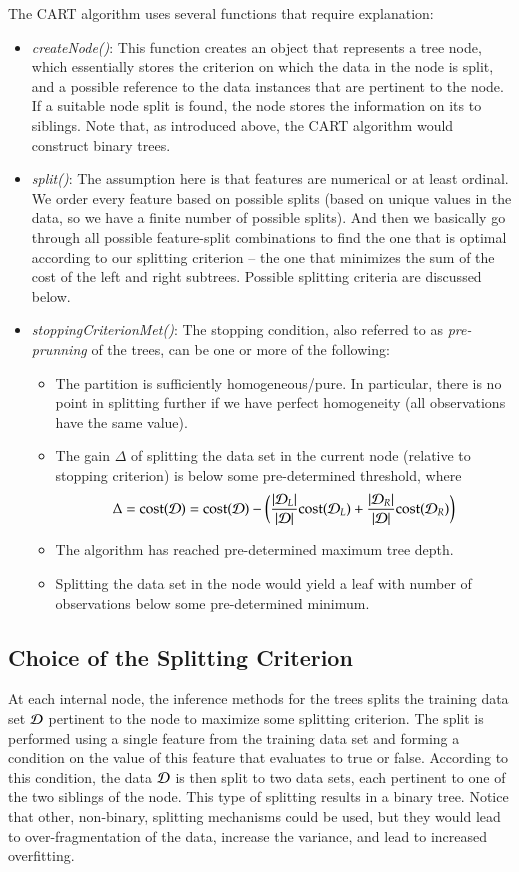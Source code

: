 \begin{refsection}
The CART algorithm uses several functions that require explanation:
\begin{itemize}
\item {\em createNode()}: This function creates an object that represents a tree node, which essentially stores the criterion on which the data in the node is split, and a possible reference to the data instances that are pertinent to the node. If a suitable node split is found, the node stores the information on its to siblings. Note that, as introduced above, the CART algorithm would construct binary trees.
\item {\em split()}: The assumption here is that features are numerical or at least ordinal. We order every feature based on possible splits (based on unique values in the data, so we have a finite number of possible splits). And then we basically go through all possible feature-split combinations to find the one that is optimal according to our splitting criterion -- the one that minimizes the sum of the cost of the left and right subtrees. Possible splitting criteria are discussed below.

\item {\em stoppingCriterionMet()}: The stopping condition, also referred to as {\em pre-prunning} of the trees, can be one or more of the following:
\begin{itemize}
\item The partition is sufficiently homogeneous/pure. In particular, there is no point in splitting further if we have perfect homogeneity (all observations have the same value).
\item The gain $\Delta$ of splitting the data set in the current node (relative to stopping criterion) is below some pre-determined threshold, where
$$ \Delta = {\rm cost}(\mathcal{D}) = {\rm cost}(\mathcal{D})-\left({|\mathcal{D}_L|\over |\mathcal{D}|}{\rm cost}(\mathcal{D}_L) + {|\mathcal{D}_R|\over |\mathcal{D}|}{\rm cost}(\mathcal{D}_R)\right)$$
\item The algorithm has reached pre-determined maximum tree depth.
\item Splitting the data set in the node would yield a leaf with number of observations below some pre-determined minimum.
\end{itemize}
\end{itemize}


\subsection*{Choice of the Splitting Criterion}

At each internal node, the inference methods for the trees splits the training data set $\mathcal{D}$ pertinent to the node to maximize some splitting criterion. The split is performed using a single feature from the training data set and forming a condition on the value of this feature that evaluates to true or false. According to this condition, the data $\mathcal{D}$ is then split to two data sets, each pertinent to one of the two siblings of the node. This type of splitting results in a binary tree. Notice that other, non-binary, splitting mechanisms could be used, but they would lead to over-fragmentation of the data, increase the variance, and lead to increased overfitting.


\end{refsection}
